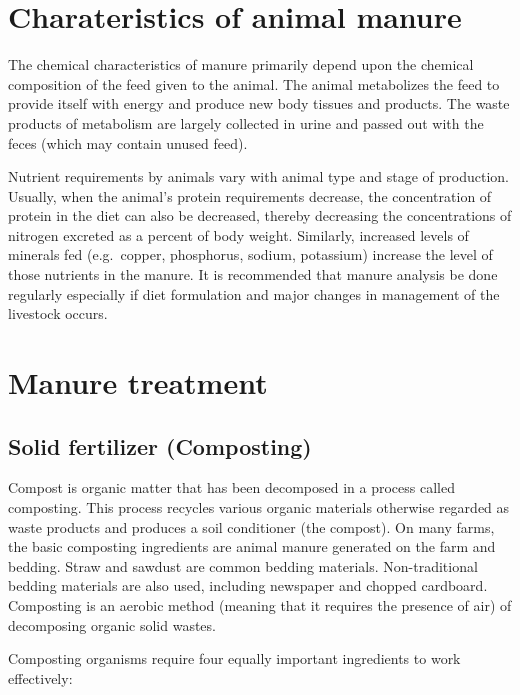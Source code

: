 \documentclass[]{book}
\begin{document}
\section{Charateristics of animal
manure}\label{charateristics-of-animal-manure}

The chemical characteristics of manure primarily depend upon the
chemical composition of the feed given to the animal. The animal
metabolizes the feed to provide itself with energy and produce new body
tissues and products. The waste products of metabolism are largely
collected in urine and passed out with the feces (which may contain
unused feed).

Nutrient requirements by animals vary with animal type and stage of
production. Usually, when the animal's protein requirements decrease,
the concentration of protein in the diet can also be decreased, thereby
decreasing the concentrations of nitrogen excreted as a percent of body
weight. Similarly, increased levels of minerals fed (e.g.~copper,
phosphorus, sodium, potassium) increase the level of those nutrients in
the manure. It is recommended that manure analysis be done regularly
especially if diet formulation and major changes in management of the
livestock occurs.

\section{Manure treatment}\label{manure-treatment}

\subsection{Solid fertilizer
(Composting)}\label{solid-fertilizer-composting}

Compost is organic matter that has been decomposed in a process called
composting. This process recycles various organic materials otherwise
regarded as waste products and produces a soil conditioner (the
compost). On many farms, the basic composting ingredients are animal
manure generated on the farm and bedding. Straw and sawdust are common
bedding materials. Non-traditional bedding materials are also used,
including newspaper and chopped cardboard. Composting is an aerobic
method (meaning that it requires the presence of air) of decomposing
organic solid wastes.

Composting organisms require four equally important ingredients to work
effectively:
\end{document}

